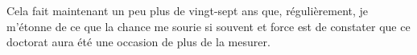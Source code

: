 

%
%
%
%
%
%
%

Cela fait maintenant un peu plus de vingt-sept ans que, régulièrement, 
je m'étonne de ce que la chance me sourie si souvent et
force est de constater que ce doctorat aura été une occasion de plus de la mesurer.

